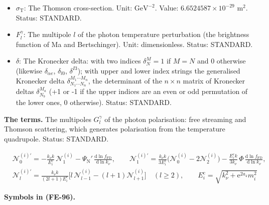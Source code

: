 \documentclass[
  10pt,
]{article}
\begin{document}
\begin{itemize}
  Status: STANDARD.
\item
  \(\sigma_{\mathrm{T}}\): The Thomson cross-section. Unit:
  \(\mathrm{GeV}^{-2}\). Value: \(6.6524587\times10^{-29}\) m\(^2\).
  Status: STANDARD.
\item
  \(F^\gamma_l\): The multipole \(l\) of the photon temperature
  perturbation (the brightness function of Ma and Bertschinger). Unit:
  dimensionless. Status: STANDARD.
\item
  \(\delta\): The Kronecker delta: with two indices \(\delta^M_N = 1\)
  if \(M = N\) and 0 otherwise (likewise \(\delta_{\alpha e}\),
  \(\delta_{l0}\), \(\delta^{I3}\)); with upper and lower index strings
  the generalised Kronecker delta
  \(\delta^{M_1\cdots M_n}_{N_1\cdots N_n}\), the determinant of the
  \(n \times n\) matrix of Kronecker deltas \(\delta^{M_a}_{N_b}\) (+1
  or -1 if the upper indices are an even or odd permutation of the lower
  ones, 0 otherwise). Status: STANDARD.
\end{itemize}

\textbf{The terms.} The multipoles \(G^\gamma_l\) of the photon
polarisation: free streaming and Thomson scattering, which generates
polarisation from the temperature quadrupole. Status: STANDARD.

\[
\begin{aligned}
&\mathcal{N}^{(i)\prime}_0 = -\frac{k_\nu k}{E^{\mathrm{c}}_i}\,\mathcal{N}^{(i)}_1
 - \Psi_{\mathrm{N}}'\,\frac{\mathrm{d}\ln f_{\mathrm{FD}}}{\mathrm{d}\ln k_\nu},\qquad
 \mathcal{N}^{(i)\prime}_1 = \frac{k_\nu k}{3E^{\mathrm{c}}_i}\big(\mathcal{N}^{(i)}_0 -
 2\mathcal{N}^{(i)}_2\big)
 - \frac{E^{\mathrm{c}}_ik}{3k_\nu}\,\Phi\,\frac{\mathrm{d}\ln f_{\mathrm{FD}}}{\mathrm{d}\ln k_\nu},\\
&\mathcal{N}^{(i)\prime}_l = \frac{k_\nu k}{(2l + 1)E^{\mathrm{c}}_i}\big[l\,\mathcal{N}^{(i)}_{l-1} -
 (l + 1)\mathcal{N}^{(i)}_{l+1}\big]
 \quad (l \ge 2),\qquad E^{\mathrm{c}}_i = \sqrt{k_\nu^2 + \mathrm{e}^{2a_4}m_i^2}
\end{aligned} \tag{FE-96}
\]

\textbf{Symbols in (FE-96).}
\end{document}

